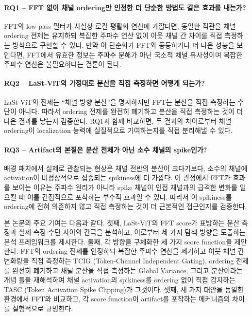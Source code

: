 \documentclass[10pt,twocolumn,letterpaper]{article}
\begin{document}
\paragraph{RQ1 -- FFT 없이 채널 ordering만 인정한 더 단순한 방법도 같은 효과를 내는가?}
FFT의 low-pass 필터가 사실상 로컬 평활화 연산에 가깝다면, 동일한 직관을 채널 ordering 전제는 유지하되 복잡한 주파수 연산 없이 이웃 채널 간 차이를 직접 측정하는 방식으로 구현할 수 있다. 만약 이 단순화가 FFT와 동등하거나 더 나은 성능을 보인다면, FFT에서 유효한 정보는 주파수 분해가 아닌 국소적 채널 유사성이며 복잡한 주파수 연산은 불필요하다는 결론이 된다.

\paragraph{RQ2 -- LaSt-ViT의 가정대로 분산을 직접 측정하면 어떻게 되는가?}
LaSt-ViT의 전제는 ``채널 방향 분산''을 명시하지만 FFT는 분산을 직접 측정하는 수단이 아니다. 따라서 ordering 전제를 완전히 폐기하고 분산을 직접 측정하는 것이 더 나은 결과를 낳는지 검증한다. RQ1과 함께 비교하면, 두 결과의 차이로부터 채널 ordering이 localization 능력에 실질적으로 기여하는지를 직접 분리해낼 수 있다.

\paragraph{RQ3 -- Artifact의 본질은 분산 전체가 아닌 소수 채널의 spike인가?}
배경 패치에서 실제로 관찰되는 현상은 채널 전반의 분산이 크다기보다, 소수의 채널에 activation이 비정상적으로 집중되는 spikiness에 더 가깝다. 이 관점에서 FFT가 효과를 보이는 이유는 주파수 원리가 아니라 spike 채널이 인접 채널과의 급격한 변화를 일으킬 때 이를 간접적으로 포착하는 부수적 효과일 수 있다. 따라서 이 spikiness를 ordering에 전혀 의존하지 않고 직접 측정하는 것이 더 근본적인 접근인지를 검증한다.

본 논문의 주요 기여는 다음과 같다. 첫째, LaSt-ViT의 FFT score가 표방하는 분산 측정과 실제 측정 수단 사이의 간극을 분석하고, 이로부터 세 가지 탐색 방향을 도출하는 분석 프레임워크를 제시한다. 둘째, 각 방향을 구체화한 세 가지 score function을 제안한다. FFT의 ordering 전제를 인정하되 복잡한 주파수 연산을 제거하고 이웃 채널 간 변화량을 직접 측정하는 TCIG (Token-Channel Independent Gating), ordering 전제를 완전히 폐기하고 채널 분산을 직접 측정하는 Global Variance, 그리고 분산이라는 개념 틀을 재해석하여 채널 activation의 spikiness를 ordering 없이 직접 감지하는 TASC (Token Activation Spike Clipping)가 그것이다. 셋째, 세 가지 대안을 동일한 환경에서 FFT와 비교하고, 각 score function이 artifact를 포착하는 메커니즘의 차이를 실험적으로 규명한다.
\end{document}
